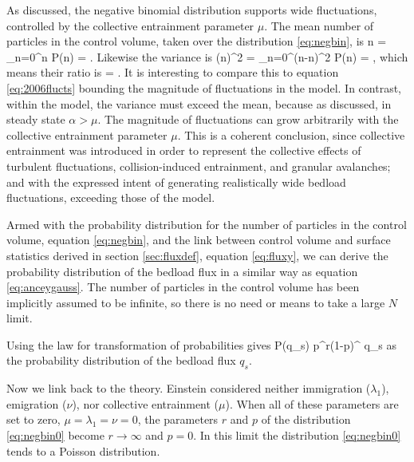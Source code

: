 As discussed, the negative binomial distribution supports wide fluctuations, controlled by the collective entrainment parameter $\mu$. 
The mean number of particles in the control volume, taken over the distribution \ref{eq:negbin}, is 
\be \bra n \ket = \sum_{n=0}^\infty n P(n) = \frac{\lambda}{\alpha-\mu}. \label{eq:anceymean}\ee
Likewise the variance is 
\be \bra (\delta n)^2 \ket = \sum_{n=0}^\infty (n-\bra n\ket)^2 P(n) = ,\ee
which means their ratio is 
\be {} = .\ee
It is interesting to compare this to equation \ref{eq:2006flucts} bounding the magnitude of fluctuations in the \citet{Ancey2006} model. 
In contrast, within the \citet{Ancey2008} model, the variance must exceed the mean, because as discussed, in steady state $\alpha>\mu$. 
The magnitude of fluctuations can grow arbitrarily with the collective entrainment parameter $\mu$. 
This is a coherent conclusion, since collective entrainment was introduced in order to represent the collective effects of turbulent fluctuations, collision-induced entrainment, and granular avalanches; and with the expressed intent of generating realistically wide bedload fluctuations, exceeding those of the \citet{Ancey2006} model. 

Armed with the probability distribution for the number of particles in the control volume, equation \ref{eq:negbin}, and the link between control volume and surface statistics derived in section \ref{sec:fluxdef}, equation \ref{eq:fluxy}, we can derive the probability distribution of the bedload flux in a similar way as equation \ref{eq:anceygauss}.
The number of particles in the control volume has been implicitly assumed to be infinite, so there is no need or means to take a large $N$ limit. 

Using the law for transformation of probabilities gives 
\be P(q_s) \approx {}p^r(1-p)^{ q_s}\ee
as the probability distribution of the bedload flux $q_s$. 

Now we link back to the \citet{Einstein1950} theory. 
Einstein considered neither immigration ($\lambda_1$), emigration ($\nu$), nor collective entrainment ($\mu$). 
When all of these parameters are set to zero, $\mu = \lambda_1 = \nu = 0$, the parameters $r$ and $p$ of the distribution \ref{eq:negbin0} become $r \rightarrow \infty$ and $p=0$. 
In this limit the distribution \ref{eq:negbin0} tends to a Poisson distribution. 

